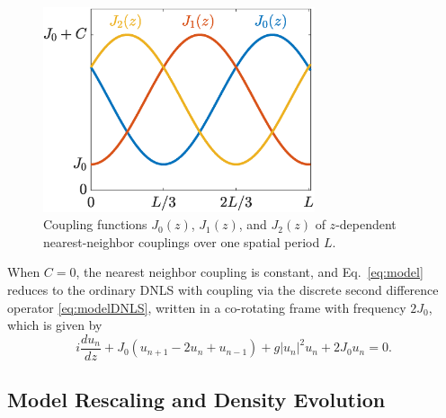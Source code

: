 \documentclass[reprint, amsmath,amssymb,aps,pre]{revtex4-2}
\begin{document}
\begin{figure}
    \centering
    \includegraphics[width=8cm]{J.eps}
    \caption{Coupling functions $J_0(z)$, $J_1(z)$, and $J_2(z)$ of $z$-dependent nearest-neighbor couplings over one spatial period $L$.}
    \label{fig:J}
\end{figure}
When $C = 0$, the nearest neighbor coupling is constant, and Eq.~\cref{eq:model} reduces to the ordinary DNLS with coupling via the discrete second difference operator \cref{eq:modelDNLS}, written in a co-rotating frame with frequency $2 J_0$, which is given by
\begin{equation}\label{eq:modelDNLS}
i \frac{d u_n}{d z} + J_0( u_{n+1} - 2 u_n + u_{n-1}) + g|u_n|^2 u_n 
+ 2 J_0 u_n 
= 0.
\end{equation}

\subsection{Model Rescaling and Density Evolution}\label{sec:rescaling}
\end{document}
